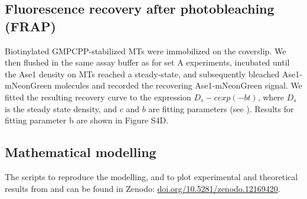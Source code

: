 \subsection{Fluorescence recovery after photobleaching (FRAP)}
Biotinylated GMPCPP-stabilized MTs were immobilized on the coverslip. We then flushed in the same assay buffer as for set A experiments, incubated until the Ase1 density on MTs reached a steady-state, and subsequently bleached Ase1-mNeonGreen molecules and recorded the recovering Ase1-mNeonGreen signal. We fitted the resulting recovery curve to the expression $D_s - c exp(-bt)$, where $D_s$ is the steady state density, and $c$ and $b$ are fitting parameters (see ). Results for fitting parameter b are shown in Figure S4D.

\subsection{Mathematical modelling}
The scripts to reproduce the modelling, and to plot experimental and theoretical results from  and  can be found in Zenodo: \url{doi.org/10.5281/zenodo.12169420}. 
